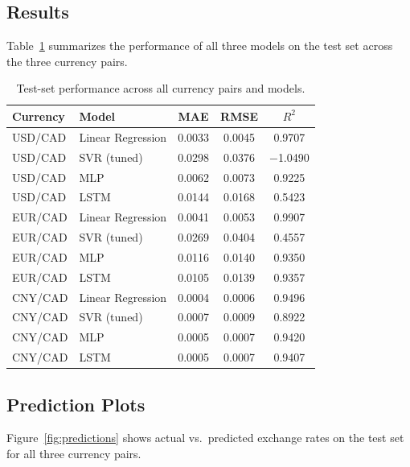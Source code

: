 \documentclass{article}
\begin{document}
\subsection{Results}

Table~\ref{tab:results} summarizes the performance of all three models on the test set across the three currency pairs.

\begin{table}[!t]
  \caption{Test-set performance across all currency pairs and models.}
  \label{tab:results}
  \centering
  \begin{tabular}{llccc}
    \toprule
    Currency & Model & MAE & RMSE & $R^2$ \\
    \midrule
    USD/CAD & Linear Regression & 0.0033 & 0.0045 & 0.9707 \\
    USD/CAD & SVR (tuned)       & 0.0298 & 0.0376 & $-$1.0490 \\
    USD/CAD & MLP               & 0.0062 & 0.0073 & 0.9225 \\
    USD/CAD & LSTM              & 0.0144 & 0.0168 & 0.5423 \\
    \midrule
    EUR/CAD & Linear Regression & 0.0041 & 0.0053 & 0.9907 \\
    EUR/CAD & SVR (tuned)       & 0.0269 & 0.0404 & 0.4557 \\
    EUR/CAD & MLP               & 0.0116 & 0.0140 & 0.9350 \\
    EUR/CAD & LSTM              & 0.0105 & 0.0139 & 0.9357 \\
    \midrule
    CNY/CAD & Linear Regression & 0.0004 & 0.0006 & 0.9496 \\
    CNY/CAD & SVR (tuned)       & 0.0007 & 0.0009 & 0.8922 \\
    CNY/CAD & MLP               & 0.0005 & 0.0007 & 0.9420 \\
    CNY/CAD & LSTM              & 0.0005 & 0.0007 & 0.9407 \\
    \bottomrule
  \end{tabular}
\end{table}

\subsection{Prediction Plots}

Figure~\ref{fig:predictions} shows actual vs.\ predicted exchange rates on the test set for all three currency pairs.
\end{document}

